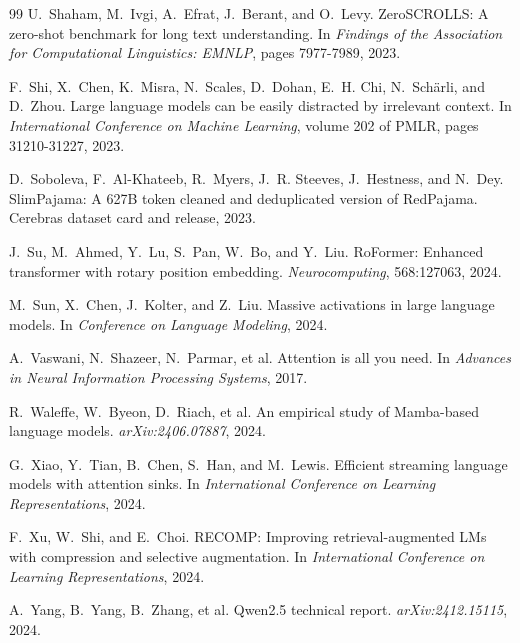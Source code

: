 \documentclass{article}
\begin{document}
{\begin{thebibliography}{99}
U.~Shaham, M.~Ivgi, A.~Efrat, J.~Berant, and O.~Levy.
\newblock ZeroSCROLLS: A zero-shot benchmark for long text understanding.
\newblock In \emph{Findings of the Association for Computational Linguistics: EMNLP}, pages 7977-7989, 2023.

F.~Shi, X.~Chen, K.~Misra, N.~Scales, D.~Dohan, E.~H. Chi, N.~Sch\"arli, and D.~Zhou.
\newblock Large language models can be easily distracted by irrelevant context.
\newblock In \emph{International Conference on Machine Learning}, volume 202 of PMLR, pages 31210-31227, 2023.

D.~Soboleva, F.~Al-Khateeb, R.~Myers, J.~R. Steeves, J.~Hestness, and N.~Dey.
\newblock SlimPajama: A 627B token cleaned and deduplicated version of RedPajama.
\newblock Cerebras dataset card and release, 2023.

J.~Su, M.~Ahmed, Y.~Lu, S.~Pan, W.~Bo, and Y.~Liu.
\newblock RoFormer: Enhanced transformer with rotary position embedding.
\newblock \emph{Neurocomputing}, 568:127063, 2024.

M.~Sun, X.~Chen, J.~Kolter, and Z.~Liu.
\newblock Massive activations in large language models.
\newblock In \emph{Conference on Language Modeling}, 2024.

A.~Vaswani, N.~Shazeer, N.~Parmar, et al.
\newblock Attention is all you need.
\newblock In \emph{Advances in Neural Information Processing Systems}, 2017.

R.~Waleffe, W.~Byeon, D.~Riach, et al.
\newblock An empirical study of Mamba-based language models.
\newblock \emph{arXiv:2406.07887}, 2024.

G.~Xiao, Y.~Tian, B.~Chen, S.~Han, and M.~Lewis.
\newblock Efficient streaming language models with attention sinks.
\newblock In \emph{International Conference on Learning Representations}, 2024.

F.~Xu, W.~Shi, and E.~Choi.
\newblock RECOMP: Improving retrieval-augmented LMs with compression and selective augmentation.
\newblock In \emph{International Conference on Learning Representations}, 2024.

A.~Yang, B.~Yang, B.~Zhang, et al.
\newblock Qwen2.5 technical report.
\newblock \emph{arXiv:2412.15115}, 2024.

\end{thebibliography}
}
\end{document}
